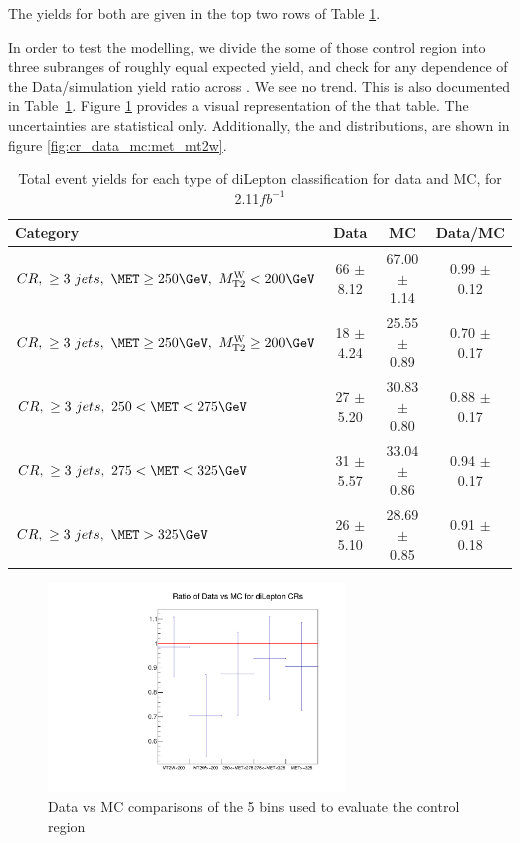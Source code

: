 The yields for both are given in the top two rows of Table \ref{tab:diLeptonType_Data_MC}.

In order to test the \MET modelling, we divide the some of those control region %
into three subranges of roughly equal expected yield, and check
for any dependence of the Data/simulation yield ratio across \MET. We see no trend. %
This is also documented in Table~\ref{tab:diLeptonType_Data_MC}.
Figure \ref{fig:cr_data_mc} provides a visual representation of the that table.  The uncertainties are statistical only. 
Additionally, the \MET and \MTtW distributions, are shown in figure \ref{fig:cr_data_mc:met_mt2w}.

\begin{table}[htb]
\begin{center}
\small
\caption{\label{tab:diLeptonType_Data_MC} Total event yields for each type of diLepton classification for data and MC, for 2.11$fb^{-1}$ }
\begin{tabular}{|l|c|c|c|} \hline
 Category & Data & MC & Data/MC \\ \hline
 $CR,~\ge3~jets,~\MET\ge250\GeV,~\MTtW<200\GeV$ & 66 $\pm$ 8.12 & 67.00 $\pm$ 1.14 & 0.99 $\pm$ 0.12 \\ \hline
 $CR,~\ge3~jets,~\MET\ge250\GeV,~\MTtW\ge200\GeV$ & 18 $\pm$ 4.24 & 25.55 $\pm$ 0.89 & 0.70 $\pm$ 0.17 \\ \hline\hline
 $CR,~\ge3~jets,~250<\MET<275\GeV$ & 27 $\pm$ 5.20 & 30.83 $\pm$ 0.80 & 0.88 $\pm$ 0.17 \\ \hline
 $CR,~\ge3~jets,~275<\MET<325\GeV$ & 31 $\pm$ 5.57 & 33.04 $\pm$ 0.86 & 0.94 $\pm$ 0.17 \\ \hline
 $CR,~\ge3~jets,~\MET>325\GeV$ & 26 $\pm$ 5.10 & 28.69 $\pm$ 0.85 & 0.91 $\pm$ 0.18 \\ \hline
\end{tabular}
\end{center}
\end{table}

\begin{figure}[ht]
\centering
\includegraphics[width=0.70\textwidth]{Figures/bkgLostLepton/data_vs_mc__diLep_CR4_5_6__ge3j__ge250met__ratioOfCRs.pdf}
\caption{\label{fig:cr_data_mc} Data vs MC comparisons of the 5 bins used to evaluate the control region}
\end{figure}


